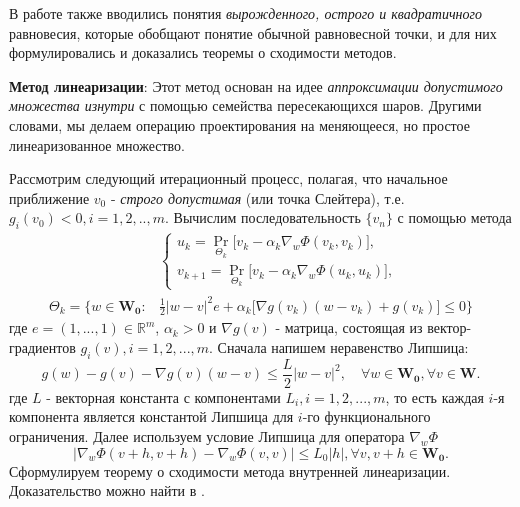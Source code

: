 В работе \cite{8-2} также вводились понятия \textit{вырожденного, острого и квадратичного} равновесия, которые обобщают понятие обычной равновесной точки, и для них формулировались и доказались теоремы о сходимости методов.

\textbf{Метод линеаризации}: Этот метод основан на идее \textit{аппроксимации допустимого множества изнутри} с помощью семейства пересекающихся шаров. Другими словами, мы делаем операцию проектирования на меняющееся, но простое линеаризованное множество.

Рассмотрим следующий итерационный процесс, полагая, что начальное приближение $v_0$ - \textit{строго допустимая} (или точка Слейтера), т.е. $g_i(v_0)<0,i=1,2,..,m$. Вычислим последовательность $\{v_n\}$ с помощью метода
\begin{equation}
\label{linear}
\begin{aligned}
&\left\{\begin{array}{l}
u_{k}=\operatorname{Pr}_{\Theta_k} \big[ v_k-\alpha_k\nabla_w\Phi(v_k,v_k)\big],\\
v_{k+1}=\operatorname{Pr}_{\Theta_k} \big[ v_k-\alpha_k\nabla_w\Phi(u_k,u_k)\big],
\end{array}\right.\\
\Theta_k = \{w\in\mathbf{W_0}:&\frac{1}{2}|w-v|^2e+\alpha_k\big[ \nabla g(v_k)(w-v_k)+g(v_k)\big]\leqslant 0 \}
\end{aligned}
\end{equation}
где $e=(1,...,1)\in\mathbb{R}^m$, $\alpha_k>0$ и $\nabla g(v)$ - матрица, состоящая из вектор-градиентов $g_i(v),i=1,2,...,m$.
Сначала напишем неравенство Липшица:
\begin{equation}
\label{lip-1}
g(w)-g(v)-\nabla g(v)(w-v)\leqslant \frac{L}{2}|w-v|^2,\quad \forall w\in\mathbf{W_0},\forall v\in\mathbf{W}.
\end{equation}
где $L$ - векторная константа с компонентами $L_i,i=1,2,...,m$, то есть каждая $i$-я компонента является константой Липшица для $i$-го функционального ограничения. Далее используем условие Липшица для оператора $\nabla_w\Phi$
\begin{equation}
\label{lip-2}
|\nabla_w\Phi(v+h,v+h)-\nabla_w\Phi(v,v)|\leqslant L_0|h|,\forall v,v+h\in\mathbf{W_0}.
\end{equation}
Сформулируем теорему о сходимости метода внутренней линеаризации. Доказательство можно найти в \cite{7}.
